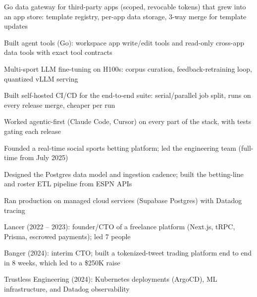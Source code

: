\documentclass[print]{jack-resume}
\begin{document}
\begin{tightemize}
    \item Go data gateway for third-party apps (scoped, revocable tokens) that grew into an app store: template registry, per-app data storage, 3-way merge for template updates
    \item Built agent tools (Go): workspace app write/edit tools and read-only cross-app data tools with exact tool contracts
    \item Multi-sport LLM fine-tuning on H100s: corpus curation, feedback-retraining loop, quantized vLLM serving
    \item Built self-hosted CI/CD for the end-to-end suite: serial/parallel job split, runs on every release merge, cheaper per run
    \item Worked agentic-first (Claude Code, Cursor) on every part of the stack, with tests gating each release
\end{tightemize}
\sectionsep

\begin{tightemize}
    \item Founded a real-time social sports betting platform; led the engineering team (full-time from July 2025)
    \item Designed the Postgres data model and ingestion cadence; built the betting-line and roster ETL pipeline from ESPN APIs
    \item Ran production on managed cloud services (Supabase Postgres) with Datadog tracing
\end{tightemize}
\sectionsep

\begin{tightemize}
    \item Lancer (2022 -- 2023): founder/CTO of a freelance platform (Next.js, tRPC, Prisma, escrowed payments); led 7 people
    \item Banger (2024): interim CTO; built a tokenized-tweet trading platform end to end in 8 weeks, which led to a \$250K raise
    \item Trustless Engineering (2024): Kubernetes deployments (ArgoCD), ML infrastructure, and Datadog observability
\end{tightemize}
\sectionsep
\end{document}
